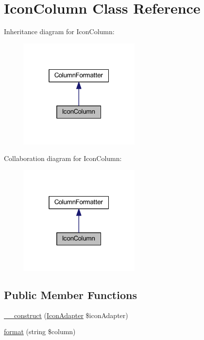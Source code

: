 \hypertarget{classhamburgscleanest_1_1_data_tables_1_1_models_1_1_column_formatters_1_1_icon_column}{}\section{Icon\+Column Class Reference}
\label{classhamburgscleanest_1_1_data_tables_1_1_models_1_1_column_formatters_1_1_icon_column}


Inheritance diagram for Icon\+Column\+:
\nopagebreak
\begin{figure}[H]
\begin{center}
\leavevmode
\includegraphics[width=172pt]{classhamburgscleanest_1_1_data_tables_1_1_models_1_1_column_formatters_1_1_icon_column__inherit__graph}
\end{center}
\end{figure}


Collaboration diagram for Icon\+Column\+:
\nopagebreak
\begin{figure}[H]
\begin{center}
\leavevmode
\includegraphics[width=172pt]{classhamburgscleanest_1_1_data_tables_1_1_models_1_1_column_formatters_1_1_icon_column__coll__graph}
\end{center}
\end{figure}
\subsection*{Public Member Functions}
\begin{DoxyCompactItemize}
\item 
\hyperlink{classhamburgscleanest_1_1_data_tables_1_1_models_1_1_column_formatters_1_1_icon_column_a0bd6b08b2291c9f839ad9e9bf7739639}{\+\_\+\+\_\+construct} (\hyperlink{interfacehamburgscleanest_1_1_data_tables_1_1_models_1_1_column_formatters_1_1_adapters_1_1_icon_1_1_icon_adapter}{Icon\+Adapter} \$icon\+Adapter)
\item 
\hyperlink{classhamburgscleanest_1_1_data_tables_1_1_models_1_1_column_formatters_1_1_icon_column_aba259f7ae8b25e70bd444020c04606e7}{format} (string \$column)
\end{DoxyCompactItemize}


